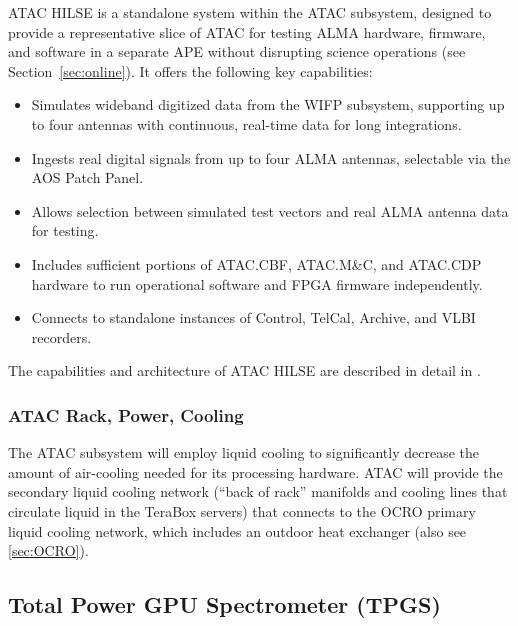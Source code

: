 \ac{ATAC} \ac{HILSE} is a standalone system within the \ac{ATAC} subsystem, designed to provide a representative slice of \ac{ATAC} for testing \ac{ALMA} hardware, firmware, and software in a separate \ac{APE} without disrupting science operations (see Section~\ref{sec:online}).
It offers the following key capabilities:
\begin{itemize}[itemsep=-0.5em]
    \item Simulates wideband digitized data from the \ac{WIFP} subsystem, supporting up to four antennas with continuous, real-time data for long integrations.
    \item Ingests real digital signals from up to four ALMA antennas, selectable via the \ac{AOS} Patch Panel.
    \item Allows selection between simulated test vectors and real \ac{ALMA} antenna data for testing.
    \item Includes sufficient portions of \ac{ATAC}.\ac{CBF}, \ac{ATAC}.M\&C, and \ac{ATAC}.\ac{CDP} hardware to run operational software and \ac{FPGA} firmware independently.
    \item Connects to standalone instances of Control, TelCal, Archive, and \ac{VLBI} recorders.
\end{itemize} 
The capabilities and architecture of \ac{ATAC} \ac{HILSE} are described in detail in \cite{atac_sdd_dd-1}.

\subsubsection{ATAC Rack, Power, Cooling}

The \ac{ATAC} subsystem will employ liquid cooling to significantly decrease the amount of air-cooling needed for its processing hardware.
\ac{ATAC} will provide the secondary liquid cooling network (``back of rack'' manifolds and cooling lines that circulate liquid in the TeraBox servers) that connects to the \ac{OCRO} primary liquid cooling network, which includes an outdoor heat exchanger (also see \ref{sec:OCRO}). 


\subsection{Total Power GPU Spectrometer (TPGS)}
\label{sec:TPGS}

